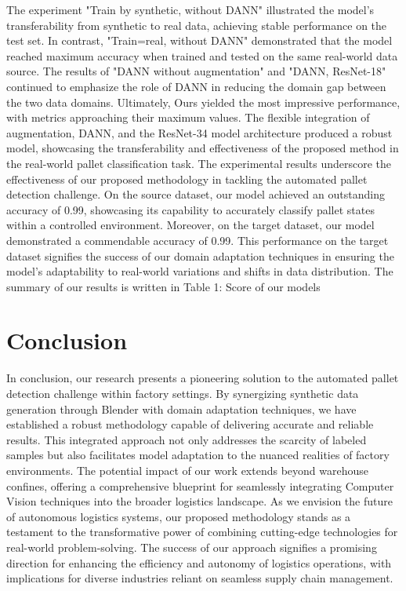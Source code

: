 \documentclass[nonacm, sigconf]{acmart}
\begin{document}
The experiment "Train by synthetic, without DANN" illustrated the model's transferability from synthetic to real data, achieving stable performance on the test set. In contrast, "Train=real, without DANN" demonstrated that the model reached maximum accuracy when trained and tested on the same real-world data source. The results of "DANN without augmentation" and "DANN, ResNet-18" continued to emphasize the role of DANN in reducing the domain gap between the two data domains. Ultimately, Ours yielded the most impressive performance, with metrics approaching their maximum values. The flexible integration of augmentation, DANN, and the ResNet-34 model architecture produced a robust model, showcasing the transferability and effectiveness of the proposed method in the real-world pallet classification task.
The experimental results underscore the effectiveness of our proposed methodology in tackling the automated pallet detection challenge. On the source dataset, our model achieved an outstanding accuracy of 0.99, showcasing its capability to accurately classify pallet states within a controlled environment.
Moreover, on the target dataset, our model demonstrated a commendable accuracy of 0.99. This performance on the target dataset signifies the success of our domain adaptation techniques in ensuring the model's adaptability to real-world variations and shifts in data distribution. The summary of our results is written in Table 1: Score of our models
\section{Conclusion}
\noindent
In conclusion, our research presents a pioneering solution to the automated pallet detection challenge within factory settings. By synergizing synthetic data generation through Blender with domain adaptation techniques, we have established a robust methodology capable of delivering accurate and reliable results. This integrated approach not only addresses the scarcity of labeled samples but also facilitates model adaptation to the nuanced realities of factory environments.
The potential impact of our work extends beyond warehouse confines, offering a comprehensive blueprint for seamlessly integrating Computer Vision techniques into the broader logistics landscape. As we envision the future of autonomous logistics systems, our proposed methodology stands as a testament to the transformative power of combining cutting-edge technologies for real-world problem-solving. The success of our approach signifies a promising direction for enhancing the efficiency and autonomy of logistics operations, with implications for diverse industries reliant on seamless supply chain management.









\appendix
\end{document}
